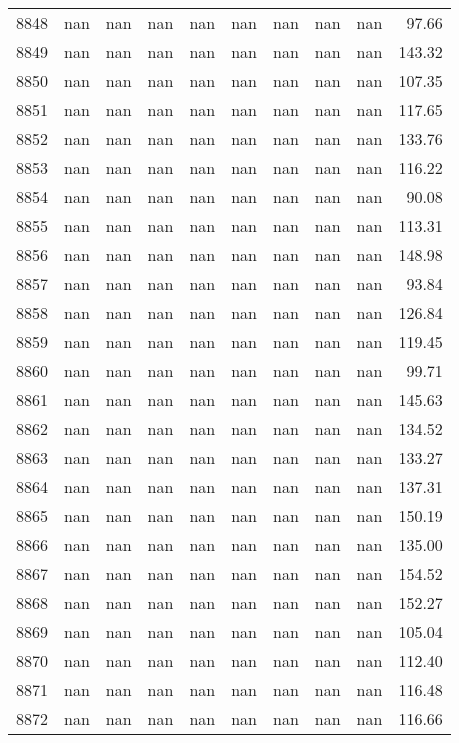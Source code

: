 \begin{tabular}{lrrrrrrrrr}
8848 & nan & nan & nan & nan & nan & nan & nan & nan & 97.66 \\
8849 & nan & nan & nan & nan & nan & nan & nan & nan & 143.32 \\
8850 & nan & nan & nan & nan & nan & nan & nan & nan & 107.35 \\
8851 & nan & nan & nan & nan & nan & nan & nan & nan & 117.65 \\
8852 & nan & nan & nan & nan & nan & nan & nan & nan & 133.76 \\
8853 & nan & nan & nan & nan & nan & nan & nan & nan & 116.22 \\
8854 & nan & nan & nan & nan & nan & nan & nan & nan & 90.08 \\
8855 & nan & nan & nan & nan & nan & nan & nan & nan & 113.31 \\
8856 & nan & nan & nan & nan & nan & nan & nan & nan & 148.98 \\
8857 & nan & nan & nan & nan & nan & nan & nan & nan & 93.84 \\
8858 & nan & nan & nan & nan & nan & nan & nan & nan & 126.84 \\
8859 & nan & nan & nan & nan & nan & nan & nan & nan & 119.45 \\
8860 & nan & nan & nan & nan & nan & nan & nan & nan & 99.71 \\
8861 & nan & nan & nan & nan & nan & nan & nan & nan & 145.63 \\
8862 & nan & nan & nan & nan & nan & nan & nan & nan & 134.52 \\
8863 & nan & nan & nan & nan & nan & nan & nan & nan & 133.27 \\
8864 & nan & nan & nan & nan & nan & nan & nan & nan & 137.31 \\
8865 & nan & nan & nan & nan & nan & nan & nan & nan & 150.19 \\
8866 & nan & nan & nan & nan & nan & nan & nan & nan & 135.00 \\
8867 & nan & nan & nan & nan & nan & nan & nan & nan & 154.52 \\
8868 & nan & nan & nan & nan & nan & nan & nan & nan & 152.27 \\
8869 & nan & nan & nan & nan & nan & nan & nan & nan & 105.04 \\
8870 & nan & nan & nan & nan & nan & nan & nan & nan & 112.40 \\
8871 & nan & nan & nan & nan & nan & nan & nan & nan & 116.48 \\
8872 & nan & nan & nan & nan & nan & nan & nan & nan & 116.66 \\

\end{tabular}
